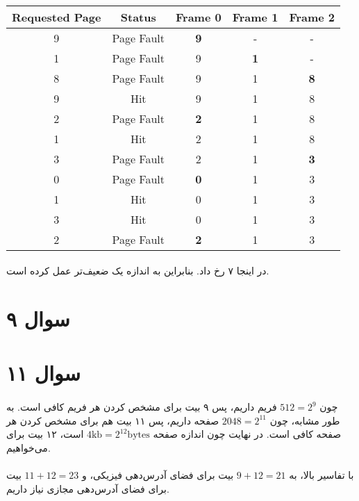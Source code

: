 \documentclass{article}
\begin{document}
	\paragraph*{}
	\begin{latin}
		\centering
		\begin{tabular}{c|c|c|c|c}
			Requested Page & Status & Frame 0 & Frame 1 & Frame 2 \\
			\hline
			9 & Page Fault & \textbf{9} & - & - \\
			\hline
			1 & Page Fault & 9 & \textbf{1} & - \\
			\hline
			8 & Page Fault & 9 & 1 & \textbf{8} \\
			\hline
			9 & Hit & 9 & 1 & 8 \\
			\hline
			2 & Page Fault & \textbf{2} & 1 & 8 \\
			\hline
			1 & Hit & 2 & 1 & 8 \\
			\hline
			3 & Page Fault & 2 & 1 & \textbf{3} \\
			\hline
			0 & Page Fault & \textbf{0} & 1 & 3 \\
			\hline
			1 & Hit & 0 & 1 & 3 \\
			\hline
			3 & Hit & 0 & 1 & 3 \\
			\hline
			2 & Page Fault & \textbf{2} & 1 & 3 \\
		\end{tabular}
	\end{latin}

	\paragraph*{}
	در اینجا ۷
	رخ داد. بنابراین
	به اندازه یک
	ضعیف‌تر عمل کرده است.

	\section*{سوال ۹}
	\paragraph*{}


	\section*{سوال ۱۱}
	\paragraph*{}
	چون
	$512 = 2^9$
	فریم داریم، پس ۹ بیت برای مشخص کردن هر فریم کافی است. به طور مشابه، چون
	$2048 = 2^{11}$
	صفحه داریم، پس ۱۱ بیت هم برای مشخص کردن هر صفحه کافی است. در نهایت چون اندازه صفحه
	$4\textrm{kb} = 2^{12} \textrm{bytes}$
	است، ۱۲ بیت برای
	می‌خواهیم.

	\paragraph*{}
	با تفاسیر بالا، به
	$9 + 12 = 21$
	بیت برای فضای آدرس‌دهی فیزیکی، و
	$11 + 12 = 23$
	بیت برای فضای آدرس‌دهی مجازی نیاز داریم.
\end{document}
